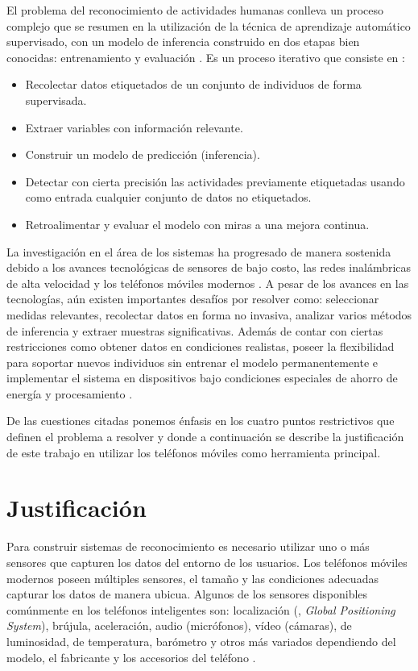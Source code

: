 El problema del reconocimiento de actividades humanas conlleva un
proceso complejo que se resumen en la utilización de la técnica de
aprendizaje automático supervisado, con un modelo de inferencia construido
en dos etapas bien conocidas: entrenamiento y evaluación \cite{LaraLabrador2013,Kwapisz2011}.
Es un proceso iterativo que consiste en \cite{Bao2004}:
\begin{itemize}
\item Recolectar datos etiquetados de un conjunto de individuos de forma
supervisada. 
\item Extraer variables con información relevante.
\item Construir un modelo de predicción (inferencia).
\item Detectar con cierta precisión las actividades previamente etiquetadas
usando como entrada cualquier conjunto de datos no etiquetados.
\item Retroalimentar y evaluar el modelo con miras a una mejora continua.
\end{itemize}
La investigación en el área de los sistemas  ha progresado
de manera sostenida debido a los avances tecnológicas de sensores
de bajo costo, las redes inalámbricas de alta velocidad y los teléfonos
móviles modernos \cite{Chen2012}. A pesar de los avances en las tecnologías,
aún existen importantes desafíos por resolver como: seleccionar medidas
relevantes, recolectar datos en forma no invasiva, analizar varios
métodos de inferencia y extraer muestras significativas. Además de
contar con ciertas restricciones como obtener datos en condiciones
realistas, poseer la flexibilidad para soportar nuevos individuos
sin entrenar el modelo permanentemente e implementar el sistema en
dispositivos bajo condiciones especiales de ahorro de energía y procesamiento
\cite{LaraLabrador2013}. 

De las cuestiones citadas ponemos énfasis en los cuatro puntos restrictivos
que definen el problema a resolver y donde a continuación se describe
la justificación de este trabajo en utilizar los teléfonos móviles
como herramienta principal.

\section{Justificación}

\label{sec12:justificaciuxf3n}

Para construir sistemas de reconocimiento es necesario utilizar uno
o más sensores que capturen los datos del entorno de los usuarios.
Los teléfonos móviles modernos poseen múltiples sensores, el tamaño
y las condiciones adecuadas capturar los datos de manera ubicua. Algunos
de los sensores disponibles comúnmente en los teléfonos inteligentes
son: localización (, \emph{Global Positioning System}),
brújula, aceleración, audio (micrófonos), vídeo (cámaras), de luminosidad,
de temperatura, barómetro y otros más variados dependiendo del modelo,
el fabricante y los accesorios del teléfono \cite{Kwapisz2011}.

